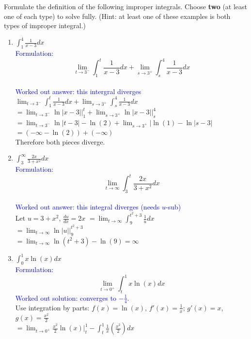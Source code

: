 \documentclass{ximera}
\begin{document}
\begin{exercise}
    Formulate the definition of the following improper integrals.  Choose \textbf{two} (at least one of each type) to solve fully. (Hint: at least one of these examples is both types of improper integral.)
    \begin{enumerate}
        \item $\int_1^4 \frac{1}{x-3}dx$\\
        \textcolor{blue}{Formulation:}
        $$\lim_{t\rightarrow 3^-}\int_1^t \frac{1}{x-3}dx + \lim_{s\rightarrow 3^+} \int_s^4\frac{1}{x-3}dx$$\\
        \textcolor{blue}{Worked out answer: this intergral diverges\\}
        $\lim_{t\rightarrow 3^-}\int_1^t \frac{1}{x-3}dx + \lim_{s\rightarrow 3^+} \int_s^4\frac{1}{x-3}dx$\\
        $=\lim_{t\rightarrow 3^-}\ln|x-3|\bigg|_1^t + \lim_{s\rightarrow 3^+} \ln|x-3|\bigg|_s^4$\\
        $=\lim_{t\rightarrow 3^-} \ln|t-3|-\ln(2)+\lim_{s\rightarrow 3^+}|\ln(1)-\ln|s-3|$\\
        $=(-\infty-\ln(2))+(-\infty)$\\
        Therefore both pieces diverge.
        \item $\int_3^\infty \frac{2x}{3+x^2}dx$\\
        \textcolor{blue}{Formulation:}
        $$\lim_{t\rightarrow \infty}\int_3^t\frac{2x}{3+x^2}dx$$\\
        \textcolor{blue}{Worked out answer: this integral diverges (needs $u$-sub)\\}
        Let $u=3+x^2$, $\frac{du}{dx}=2x$
        $=\lim_{t\rightarrow \infty}\int_9^{t^2+3}\frac{1}{u}dx$\\
        $=\lim_{t\rightarrow \infty} \ln|u|\bigg|_9^{t^2+3}$\\
        $=\lim_{t\rightarrow \infty} \ln(t^2+3)-\ln(9)=\infty$
        \item $\int_0^1 x\ln(x)dx$\\
        \textcolor{blue}{Formulation:\\}
        $$\lim_{t\rightarrow 0^+}\int_t^1 x\ln(x)dx$$
        \textcolor{blue}{Worked out solution: converges to $-\frac14$.\\}
        Use integration by parts: $f(x)=\ln(x)$, $f'(x)=\frac1x$; $g'(x)=x$, $g(x)=\frac{x^2}{2}$\\
        $=\lim_{t\rightarrow 0^+} \frac{x^2}{2}\ln(x)\bigg|_t^1 -\int_t^1 \frac{1}{x}\left(\frac{x^2}{2}\right)dx$\\

\end{enumerate}
\end{exercise}
\end{document}
